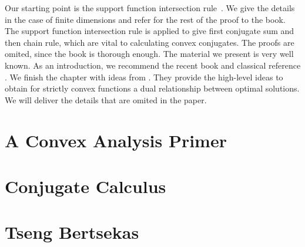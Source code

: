 \documentclass[11pt, a4paper, BCOR=10mm, DIV=11]{scrbook}
\theoremstyle{definition}
\theoremstyle{plain}
\begin{document}
Our starting point is 
the support function intersection rule~\cite[Theorem 4.23]{Mordukhovich2022}.
We give the details in the case of finite dimensions and refer for the rest of the proof to the book.
The support function intersection rule is applied to give first conjugate sum and then chain rule,
which are vital to calculating convex conjugates. The proofs are omited, since the book is thorough enough. 
The material we present is very well known.
As an introduction, we recommend the recent book \cite{Mordukhovich2022} and classical reference \cite{Rockafellar1970}.
We finish the chapter with ideas from \cite{Tseng1991}. 
They provide the high-level ideas to obtain for strictly convex
functions a dual relationship between optimal solutions.
We will deliver the details that are omited in the paper.
  \section{A Convex Analysis Primer}
  
  \section{Conjugate Calculus}
  
%
  \newpage
  \section{Tseng Bertsekas}
  
\end{document}
